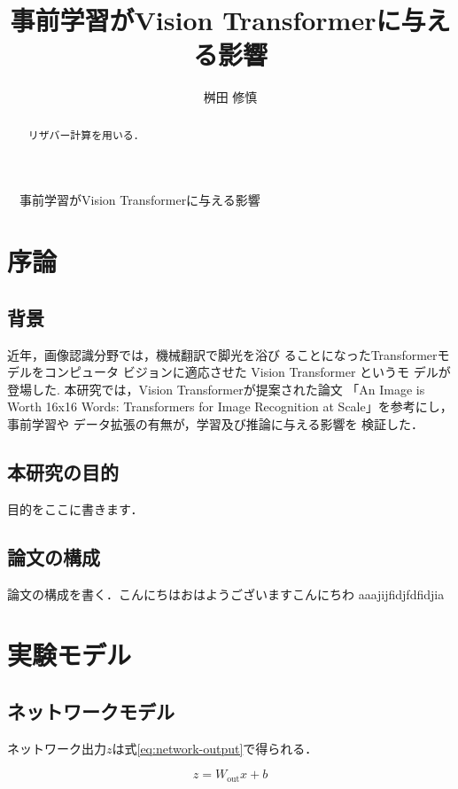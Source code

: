 \documentclass[a4paper, oneside, openany, dvipdfmx]{suribt}%
\title{事前学習がVision Transformerに与える影響}
\author{桝田 修慎}
\newcommand{\eref}[1]{式\eqref{#1}}
\begin{document}
\maketitle%
　事前学習がVision Transformerに与える影響

\frontmatter%
\begin{abstract}%
  リザバー計算\cite{jaeger2004harnessing,maass2002real}を用いる．
\end{abstract}

\tableofcontents%


\mainmatter%
\chapter{序論}
\section{背景}
近年，画像認識分野では，機械翻訳で脚光を浴び
ることになったTransformer\cite{dosovitskiy2021image}モデルをコンピュータ ビジョンに適応させた Vision Transformer というモ デルが登場した.
本研究では，Vision Transformerが提案された論文
「An Image is Worth 16x16 Words: Transformers for Image Recognition at Scale」を参考にし，事前学習や データ拡張の有無が，学習及び推論に与える影響を 検証した．
\section{本研究の目的}
目的をここに書きます．
\section{論文の構成}
論文の構成を書く．こんにちはおはようございますこんにちわ
aaajijfidjfdfidjia


\chapter{実験モデル}
\section{ネットワークモデル}
ネットワーク出力$z$は\eref{eq:network-output}で得られる．

\begin{equation}
  z = W_\mathrm{out} x + b
  \label{eq:network-output}
\end{equation}
\end{document}
